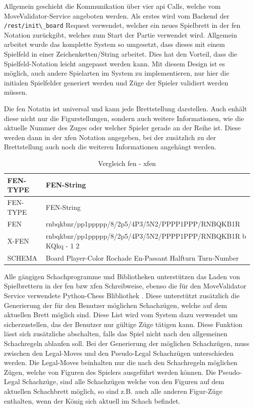 Allgemein geschieht die Kommunikation über vier \gls{api} Calls, welche
vom MoveValidator-Service angeboten werden. Als erstes wird vom Backend
der \passthrough{\lstinline!/rest/init\_board!} Request verwendet,
welcher ein neues Spielbrett in der \gls{fen} Notation zurückgibt,
welches zum Start der Partie verwendet wird. Allgemein arbeitet wurde
das komplette System so umgesetzt, dass dieses mit einem Spielfeld in
einer Zeichenketten/String arbeitet. Dies hat den Vorteil, dass die
Spielfeld-Notation leicht angepasst werden kann. Mit diesem Design ist
es möglich, auch andere Spielarten im System zu implementieren, nur hier
die initialen Spielfelder generiert werden und Züge der Spieler
validiert werden müssen.

Die \gls{fen} Notatin ist universal und kann jede Brettstellung
darstellen. Auch enhält diese nicht nur die Figurstellungen, sondern
auch weitere Informationen, wie die aktuelle Nummer des Zuges oder
welcher Spieler gerade an der Reihe ist. Diese werden dann in der
\gls{xfen} Notation angegeben, bei der zusätzlich zu der Brettstellung
auch noch die weiteren Informationen angehängt werden.

\begin{longtable}[]{@{}ll@{}}
\caption{Vergleich \gls{fen} - \gls{xfen}}\tabularnewline
\toprule
FEN-TYPE & FEN-String\tabularnewline
\midrule
\endfirsthead
\toprule
FEN-TYPE & FEN-String\tabularnewline
\midrule
\endhead
FEN & rnbqkbnr/pp1ppppp/8/2p5/4P3/5N2/PPPP1PPP/RNBQKB1R\tabularnewline
X-FEN & rnbqkbnr/pp1ppppp/8/2p5/4P3/5N2/PPPP1PPP/RNBQKB1R b KQkq - 1
2\tabularnewline
SCHEMA & Board Player-Color Rochade En-Passant Halfturn
Turn-Number\tabularnewline
\bottomrule
\end{longtable}

Alle gängigen Schachprogramme und Bibliotheken unterstützen das Laden
von Spielbrettern in der \gls{fen} bzw \gls{xfen} Schreibweise, ebenso
die für den MoveValidator Service verwendete Python-Chess Blibliothek
\cite{pythonchesslib}. Diese unterstützt zusätzlich die Generierung
der für den Benutzer möglichen Schachzügen, welche auf dem aktuellen
Brett möglich sind. Diese List wird vom System dazu verwendet um
sicherzustellen, das der Benutzer nur gültige Züge tätigen kann. Diese
Funktion lässt sich zusätzliche abschalten, falls das Spiel nicht nach
den allgemeinen Schachregeln ablaufen soll. Bei der Generierung der
möglichen Schachzügen, muss zwischen den Legal-Moves und den
Pseudo-Legal Schachzügen unterschieden werden. Die Legal-Moves
beinhalten nur die nach den Schachregeln möglichen Zügen, welche von
Figuren des Spielers ausgeführt werden können. Die Pseudo-Legal
Schachzüge, sind alle Schachzügen welche von den Figuren auf dem
aktuellen Schachbrett möglich, so sind z.B. auch alle anderen Figur-Züge
enthalten, wenn der König sich aktuell im Schach befindet.

